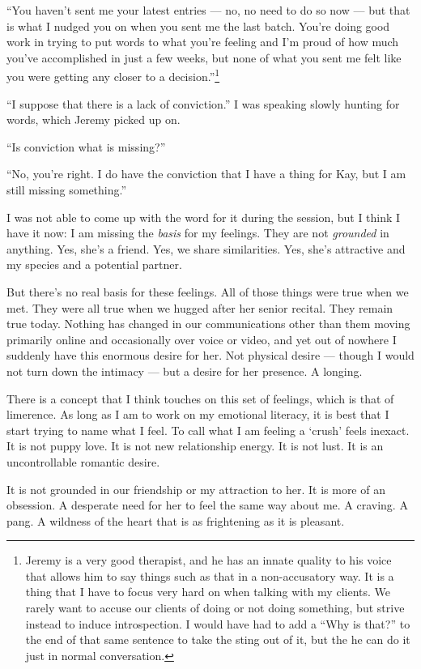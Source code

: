 ``You haven't sent me your latest entries --- no, no need to do so now --- but that is what I nudged you on when you sent me the last batch. You're doing good work in trying to put words to what you're feeling and I'm proud of how much you've accomplished in just a few weeks, but none of what you sent me felt like you were getting any closer to a decision.''\footnote{Jeremy is a very good therapist, and he has an innate quality to his voice that allows him to say things such as that in a non-accusatory way. It is a thing that I have to focus very hard on when talking with my clients. We rarely want to accuse our clients of doing or not doing something, but strive instead to induce introspection. I would have had to add a ``Why is that?'' to the end of that same sentence to take the sting out of it, but the he can do it just in normal conversation.}

``I suppose that there is a lack of conviction.'' I was speaking slowly hunting for words, which Jeremy picked up on.

``Is conviction what is missing?''

``No, you're right. I do have the conviction that I have a thing for Kay, but I am still missing something.''

I was not able to come up with the word for it during the session, but I think I have it now: I am missing the \emph{basis} for my feelings. They are not \emph{grounded} in anything. Yes, she's a friend. Yes, we share similarities. Yes, she's attractive and my species and a potential partner.

But there's no real basis for these feelings. All of those things were true when we met. They were all true when we hugged after her senior recital. They remain true today. Nothing has changed in our communications other than them moving primarily online and occasionally over voice or video, and yet out of nowhere I suddenly have this enormous desire for her. Not physical desire --- though I would not turn down the intimacy --- but a desire for her presence. A longing.

There is a concept that I think touches on this set of feelings, which is that of limerence. As long as I am to work on my emotional literacy, it is best that I start trying to name what I feel. To call what I am feeling a `crush' feels inexact. It is not puppy love. It is not new relationship energy. It is not lust. It is an uncontrollable romantic desire.

It is not grounded in our friendship or my attraction to her. It is more of an obsession. A desperate need for her to feel the same way about me. A craving. A pang. A wildness of the heart that is as frightening as it is pleasant.

